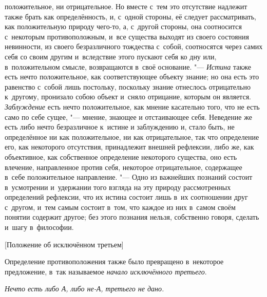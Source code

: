 положительное, ни отрицательное. Но вместе с~тем это отсутствие надлежит
также брать как определённость, и, с~одной стороны, её следует
рассматривать, как положительную природу чего-то, а, с~другой стороны, она
соотносится с~некоторым противоположным, и~все существа выходят из своего
состояния невинности, из своего безразличного тождества с~собой,
соотносятся через самих себя со своим другим и~вследствие этого пускают
себя ко дну или, в~положительном смысле, возвращаются в~своё
основание. "--- {\em Истина} также есть нечто положительное, как
соответствующее объекту знание; но она есть это равенство с~собой лишь
постольку, поскольку знание отнеслось отрицательно к~другому, пронизало
собою объект и~сняло отрицание, которым он является.
{\em Заблуждение} есть нечто положительное, как мнение
касательно того, что не есть само по себе сущее, "--- мнение, знающее и
отстаивающее себя. Неведение же есть либо нечто безразличное к~истине и
заблуждению и, стало быть, не определённое ни как положительное, ни как
отрицательное, так что определение его, как некоторого отсутствия,
принадлежит внешней рефлексии, либо же, как объективное, как собственное
определение некоторого существа, оно есть влечение, направленное против
себя, некоторое отрицательное, содержащее в~себе положительное направление.
"--- Одно из важнейших познаний состоит в~усмотрении и~удержании того взгляда
на эту природу рассмотренных определений рефлексии, что их истина состоит
лишь в~их соотношении друг с~другом, и~тем самым состоит в~том, что каждое
из них в~самом своём понятии содержит другое; без этого познания нельзя,
собственно говоря, сделать и~шагу в~философии.

%
  {[Положение об исключённом третьем]}

Определение противоположения также было превращено в~некоторое предложение,
в~так называемое {\em начало исключённого третьего}.

{\em Нечто есть либо А, либо не-А, третьего не дано.}

